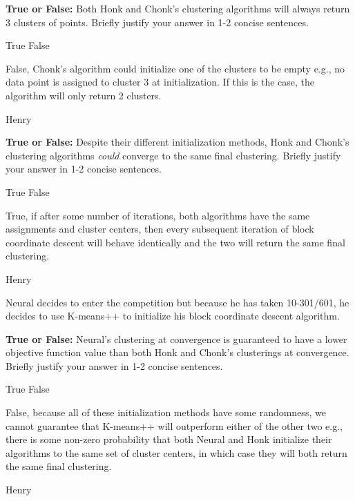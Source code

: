 \begin{parts}
\begin{subparts}
    \subpart[2] \textbf{True or False:} Both Honk and Chonk's clustering algorithms will always return $3$ clusters of points. Briefly justify your answer in 1-2 concise sentences. 
    \begin{checkboxes}
         \choice True 
         \choice False
    \end{checkboxes}
    \fillwithlines{8em}
    \begin{soln}
        False, Chonk's algorithm could initialize one of the clusters to be empty e.g., no data point is assigned to cluster 3 at initialization. If this is the case, the algorithm will only return 2 clusters. 
    \end{soln}
    \begin{qauthor}
        Henry
    \end{qauthor}

    \clearpage
    \subpart[2] \textbf{True or False:} Despite their different initialization methods, Honk and Chonk's clustering algorithms \emph{could} converge to the same final clustering. Briefly justify your answer in 1-2 concise sentences. 
    \begin{checkboxes}
         \choice True 
         \choice False
    \end{checkboxes}
    \fillwithlines{8em}
    \begin{soln}
        True, if after some number of iterations, both algorithms have the same assignments and cluster centers, then every subsequent iteration of block coordinate descent will behave identically and the two will return the same final clustering. 
    \end{soln}
    \begin{qauthor}
        Henry
    \end{qauthor}

\begin{EnvFullwidth}
    Neural decides to enter the competition but because he has taken 10-301/601, he decides to use K-means++ to initialize his block coordinate descent algorithm. 
\end{EnvFullwidth}
    
    \subpart[2] \textbf{True or False:} Neural's clustering at convergence is guaranteed to have a lower objective function value than both Honk and Chonk's clusterings at convergence. Briefly justify your answer in 1-2 concise sentences. 
    \begin{checkboxes}
         \choice True 
         \choice False
    \end{checkboxes}
    \fillwithlines{8em}
    \begin{soln}
        False, because all of these initialization methods have some randomness, we cannot guarantee that K-means++ will outperform either of the other two e.g., there is some non-zero probability that both Neural and Honk initialize their algorithms to the same set of cluster centers, in which case they will both return the same final clustering. 
    \end{soln}
    \begin{qauthor}
        Henry
    \end{qauthor}
\end{subparts}

\end{parts}